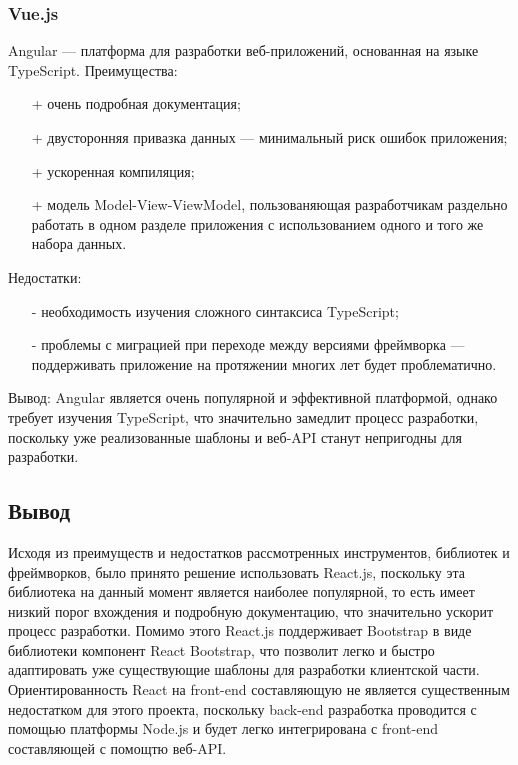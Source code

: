 \documentclass[a4paper,12pt]{article}
\begin{document}
\subsubsection{Vue.js}

Angular — платформа для разработки веб-приложений, основанная на языке TypeScript.
Преимущества:
\begin{itemize}
	\item[+] очень подробная документация;
	\item[+] двусторонняя привазка данных — минимальный риск ошибок приложения;
	\item[+] ускоренная компиляция;
	\item[+] модель Model-View-ViewModel, пользованяющая разработчикам раздельно работать в одном разделе приложения с использованием одного и того же набора данных.
\end{itemize}

Недостатки:
\begin{itemize}
	\item[-] необходимость изучения сложного синтаксиса TypeScript;
	\item[-] проблемы с миграцией при переходе между версиями фреймворка — поддерживать приложение на протяжении многих лет будет проблематично.
\end{itemize}

Вывод: Angular является очень популярной и эффективной платформой, однако требует изучения TypeScript, что значительно замедлит процесс разработки, поскольку уже реализованные шаблоны и веб-API станут непригодны для разработки.\\

\subsection{Вывод}
Исходя из преимуществ и недостатков рассмотренных инструментов, библиотек и фреймворков, было принято решение использовать React.js, поскольку эта библиотека на данный момент является наиболее популярной, то есть имеет низкий порог вхождения и подробную документацию, что значительно ускорит процесс разработки. Помимо этого React.js поддерживает Bootstrap в виде библиотеки компонент React Bootstrap, что позволит легко и быстро адаптировать уже существующие шаблоны для разработки клиентской части. Ориентированность React на front-end составляющую не является существенным недостатком для этого проекта, поскольку back-end разработка проводится с помощью платформы Node.js и будет легко интегрирована с front-end составляющей с помощтю веб-API.\\
\end{document}
